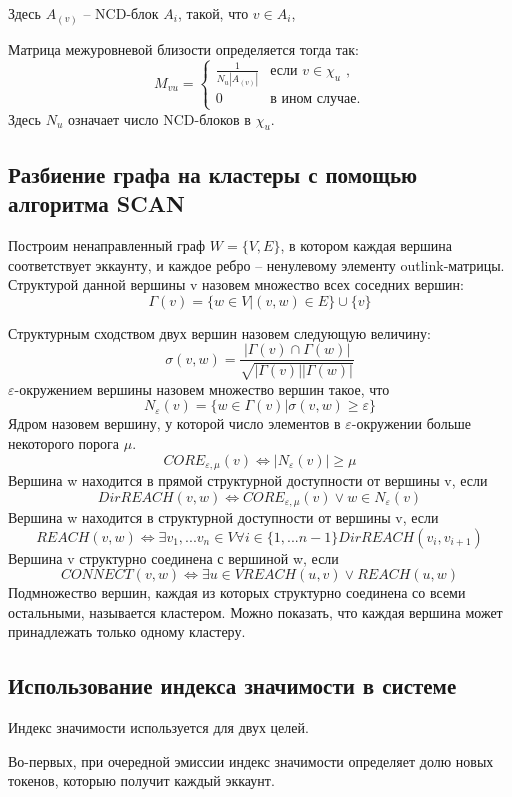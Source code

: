 \documentclass[a4paper,12pt]{article}
\begin{document}
Здесь $A_{(v)}$ -- NCD-блок $A_i$, такой, что $v \in A_i$, 

Матрица межуровневой близости определяется тогда так:
$$
M_{vu}=\begin{cases}
 \frac{1}{N_u |A_{(v)}|}
 & \text{если $v \in \chi_u$ ,}\\
 0 & \text{в ином случае.}
\end{cases}
$$
Здесь $N_u$ означает число NCD-блоков в $\chi_u$.

\subsection{Разбиение графа на кластеры с помощью алгоритма SCAN}
Построим ненаправленный граф $W = \{V, E\}$, в котором каждая вершина соответствует эккаунту, и каждое ребро – ненулевому элементу outlink-матрицы.
Структурой данной вершины v назовем множество всех соседних вершин:
$$
\Gamma(v)=\{w \in V|(v,w) \in E\} \cup \{v\}
$$

Структурным сходством двух вершин назовем следующую величину:
$$
\sigma(v,w)=\frac{ |\Gamma(v) \cap \Gamma(w)|}{\sqrt{|\Gamma(v)||\Gamma(w)|}}
$$
$\varepsilon$-окружением вершины назовем множество вершин такое, что
$$
N_{\varepsilon}(v) = \{ w \in \Gamma(v) | \sigma(v,w) \ge \varepsilon \}
$$
Ядром назовем вершину, у которой число элементов в $\varepsilon$-окружении больше некоторого порога $\mu$.
$$
CORE_{\varepsilon,\mu}(v) \Leftrightarrow |N_{\varepsilon} (v)| \ge \mu
$$
Вершина w находится в прямой структурной доступности от вершины v, если
$$
DirREACH(v,w) \Leftrightarrow CORE_{\varepsilon,\mu}(v) \vee w \in N_{\varepsilon}(v)
$$
Вершина w находится в структурной доступности от вершины v, если
$$
REACH(v,w) \Leftrightarrow \exists v_1,...v_n \in V \forall i \in \{1,...n-1\}DirREACH(v_i,v_{i+1})
$$
Вершина v структурно соединена с вершиной w, если
$$
CONNECT(v,w) \Leftrightarrow \exists u \in V REACH(u,v) \vee REACH(u,w)
$$
Подмножество вершин, каждая из которых структурно соединена со всеми остальными, называется кластером. Можно показать, что каждая вершина может принадлежать только одному кластеру.

\subsection{Использование индекса значимости в системе}
Индекс значимости используется для двух целей. 

Во-первых, при очередной эмиссии индекс значимости определяет долю новых токенов, которыю получит каждый эккаунт.
\end{document}
